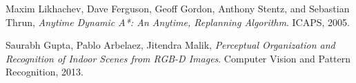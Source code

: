 \documentclass[12pt]{article}
\begin{document}
\begin{thebibliography}{9}

  Maxim Likhachev, Dave Ferguson, Geoff Gordon, Anthony Stentz, and Sebastian Thrun,
  \emph{Anytime Dynamic A*: An Anytime, Replanning Algorithm}.
  ICAPS,
  2005.

  Saurabh Gupta, Pablo Arbelaez, Jitendra Malik,
  \emph{Perceptual Organization and Recognition of Indoor Scenes from RGB-D Images}.
  Computer Vision and Pattern Recognition,
  2013.

\end{thebibliography}
\end{document}
